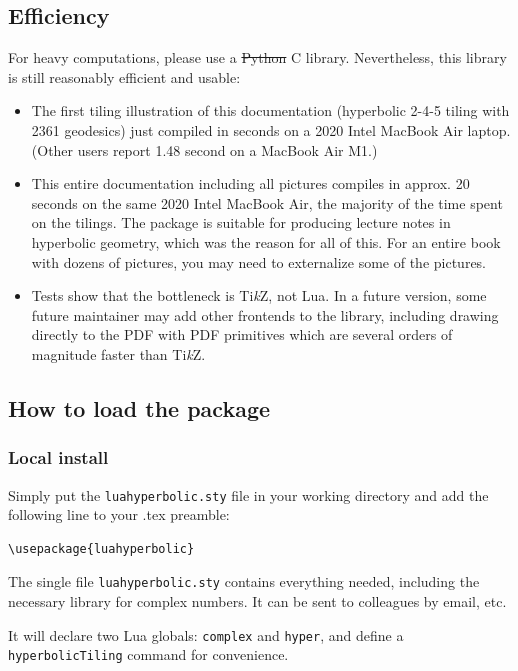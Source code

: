 \documentclass{article}
\newcommand{\TikZ}{Ti\emph{k}Z}
\begin{document}
\subsection{Efficiency}

For heavy computations, please use a \sout{Python} C library. Nevertheless, this library is still reasonably efficient and usable:
\begin{itemize}
\item The first tiling illustration of this documentation (hyperbolic 2-4-5 tiling with 2361 geodesics) just compiled in  seconds on a 2020 Intel MacBook Air laptop. (Other users report 1.48 second on a MacBook Air M1.)
\item This entire documentation including all pictures compiles in approx. 20 seconds on the same 2020 Intel MacBook Air, the majority of the time spent on the tilings. The package is suitable for producing lecture notes in hyperbolic geometry, which was the reason for all of this. For an entire book with dozens of pictures, you may need to externalize some of the pictures.
\item Tests show that the bottleneck is \TikZ, not Lua. In a future version, some future maintainer may add other frontends to the library, including drawing directly to the PDF with PDF primitives which are several orders of magnitude faster than \TikZ.
\end{itemize}


\subsection{How to load the package}

\subsubsection*{Local install}
Simply put the \verb+luahyperbolic.sty+ file in your working directory and add the following line to your .tex preamble:
\begin{verbatim}
\usepackage{luahyperbolic}
\end{verbatim}

The single file \texttt{luahyperbolic.sty} contains everything needed, including the necessary library for complex numbers.  It can be sent to colleagues by email, etc.

It will declare two Lua globals: \texttt{complex} and \texttt{hyper}, and define a \texttt{hyperbolicTiling} command for convenience.
\end{document}
